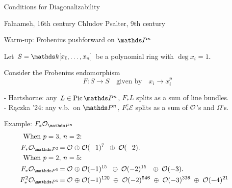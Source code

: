 \documentclass[beamer]{paper}
\newcommand{\cE}{\mathcal{E}} %
\begin{document}
\begin{frame} \centering \LARGE Conditions for Diagonalizability \end{frame}


{
\begin{frame}[b]
  \scriptsize{\hspace{0.35in} Falnameh, 16th century \hfill Chludov Psalter, 9th century \hspace*{0.12in}}
\end{frame}
}


\begin{frame}[t]{Warm-up: Frobenius pushforward on $\PPn$}

  Let $S = \kk[x_0,\dots,x_n]$ be a polynomial ring with $\deg x_i = 1$.

  \vfill
  \pause
  Consider the Frobenius endomorphism
  \[ F\colon S\to S \quad \text{given by} \quad x_i \to x_i^p \]

  \pause
  - Hartshorne: any $L\in\Pic\PPn$, $F_*L$ splits as a sum of line bundles. \\
  \pause
  - Rączka '24: any v.b.\ on $\PPn$, $F_*^e\cE$ splits as a sum of $\mathcal{O}$'s and $\Omega$'s.
  \pause
  \begin{block}{Example: $F_*\o_{\PPn}$}
    \vspace*{-0.2in}
    \begin{align*}
      \text{When $p=3$, $n=2$:} \\
      F_*\o_{\PP2}   = \o \;\oplus\; &\o(-1)^7  \;\;\oplus\; \o(-2). \\
      \text{When $p=2$, $n=5$:} \\
      F_*\o_{\PP5}   = \o \;\oplus\; &\o(-1)^{15} \;\;\oplus\; \o(-2)^{15} \,\;\;\oplus\; \o(-3). \\
      F_*^2\o_{\PP5} = \o \;\oplus\; &\o(-1)^{120}    \;\oplus\; \o(-2)^{546}  \;\oplus\; \o(-3)^{336} \;\oplus\; \o(-4)^{21}
    \end{align*}
  \end{block}
\end{frame}
\end{document}
